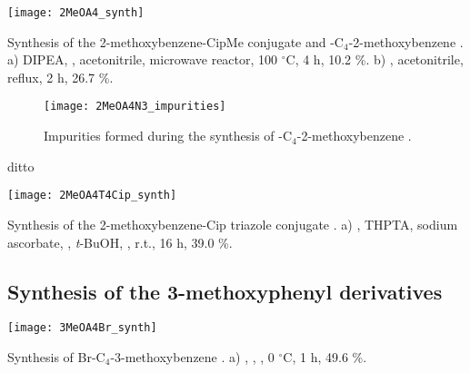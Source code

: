 \begin{scheme}[H]
	\begin{center}
		\texttt{[image: 2MeOA4\_synth]}
		\caption{Synthesis of the 2-methoxybenzene-CipMe conjugate  and -C$_4$-2-methoxybenzene . 
		a)  DIPEA, , acetonitrile, microwave reactor, 100 $^{\circ}$C, 4 h, 10.2 \%.
		b) , acetonitrile, reflux, 2 h, 26.7 \%.  \label{sch:2MeOA4_synth}}
	\end{center}
\end{scheme}


\begin{figure}[H]
	\begin{center}
		\texttt{[image: 2MeOA4N3\_impurities]}
		\caption{Impurities formed during the synthesis of -C$_4$-2-methoxybenzene .
		\label{fig:2MeOA4N3_impurities}}
	\end{center}
\end{figure}

ditto

\begin{scheme}[H]
	\begin{center}
				\texttt{[image: 2MeOA4T4Cip\_synth]}
		\caption{Synthesis of the 2-methoxybenzene-Cip triazole conjugate . 
		a) , THPTA, sodium ascorbate, , \textit{t}-BuOH, , r.t., 16 h, 39.0 \%.\label{sch:2MeOA4T4Cip_synth}}
	\end{center}
\end{scheme}

\subsection{Synthesis of the 3-methoxyphenyl derivatives}

\begin{scheme}[H]
	\begin{center}
		\texttt{[image: 3MeOA4Br\_synth]}
		\caption{Synthesis of Br-C$_4$-3-methoxybenzene .
				a) , , , 0 $^{\circ}$C, 1 h, 49.6 \%. \label{sch:3MeOA4Br_synth}}
	\end{center}
\end{scheme}

